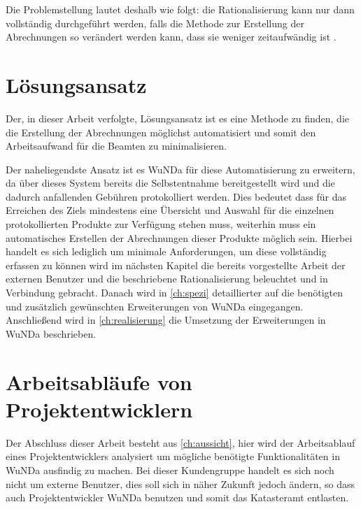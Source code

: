 Die Problemstellung lautet deshalb wie folgt: die Rationalisierung kann nur dann vollständig durchgeführt werden, falls die Methode zur Erstellung der Abrechnungen so verändert werden kann, dass sie weniger zeitaufwändig ist \autocite[vgl.][]{sander-abrechnung}. 


\section{Lösungsansatz}

Der, in dieser Arbeit verfolgte, Lösungsansatz ist es eine Methode zu finden, die die Erstellung der Abrechnungen möglichst automatisiert und somit den Arbeitsaufwand für die Beamten zu minimalisieren. 

Der naheliegendste Ansatz ist es \acs{WuNDa} für diese Automatisierung zu erweitern, da über dieses System bereits die Selbstentnahme bereitgestellt wird und die dadurch anfallenden Gebühren protokolliert werden.
Dies bedeutet dass für das Erreichen des Ziels mindestens eine Übersicht und Auswahl für die einzelnen protokollierten Produkte zur Verfügung stehen muss, weiterhin muss ein automatisches Erstellen der Abrechnungen dieser Produkte möglich sein.
Hierbei handelt es sich lediglich um minimale Anforderungen, um diese vollständig erfassen zu können wird im nächsten Kapitel die bereits vorgestellte Arbeit der externen Benutzer und die beschriebene Rationalisierung beleuchtet und in Verbindung gebracht.
Danach wird in \autoref{ch:spezi} detaillierter auf die benötigten und zusätzlich gewünschten Erweiterungen von \ac{WuNDa} eingegangen.
Anschließend wird in \autoref{ch:realisierung} die Umsetzung der Erweiterungen in \ac{WuNDa} beschrieben.

\section{Arbeitsabläufe von Projektentwicklern}
Der Abschluss dieser Arbeit besteht aus \autoref{ch:aussicht}, hier wird der Arbeitsablauf eines Projektentwicklers analysiert um mögliche benötigte Funktionalitäten in \ac{WuNDa} ausfindig zu machen.
Bei dieser Kundengruppe handelt es sich noch nicht um externe Benutzer, dies soll sich in näher Zukunft jedoch ändern, so dass auch Projektentwickler \ac{WuNDa} benutzen und somit das Katasteramt entlasten.


